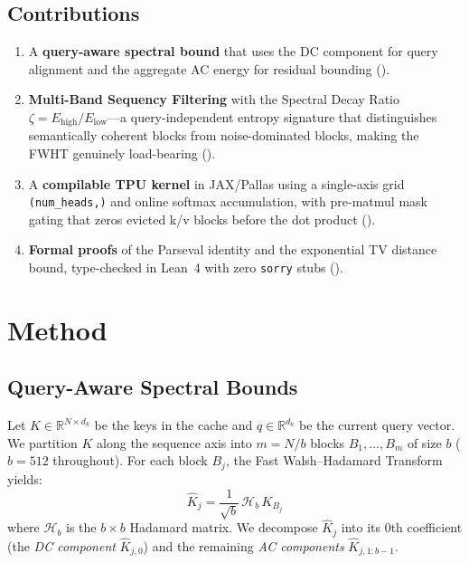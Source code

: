 \documentclass[conference,10pt]{IEEEtran}
\newcommand{\R}{\mathbb{R}}
\begin{document}
\subsection{Contributions}

\begin{enumerate}
    \item A \textbf{query-aware spectral bound} that uses the DC component for
          query alignment and the aggregate AC energy for residual bounding
          ().
    \item \textbf{Multi-Band Sequency Filtering} with the Spectral Decay
          Ratio $\zeta = E_{\text{high}} / E_{\text{low}}$---a query-independent
          entropy signature that distinguishes semantically coherent blocks from
          noise-dominated blocks, making the FWHT genuinely load-bearing
          ().
    \item A \textbf{compilable TPU kernel} in JAX/Pallas using a single-axis
          grid \texttt{(num\_heads,)} and online softmax accumulation, with
          pre-matmul mask gating that zeros evicted k/v blocks before the dot
          product ().
    \item \textbf{Formal proofs} of the Parseval identity and the exponential
          TV distance bound, type-checked in Lean~4 with zero
          \texttt{sorry} stubs ().
\end{enumerate}

\section{Method}\label{sec:method}

\subsection{Query-Aware Spectral Bounds}\label{sec:qabound}

Let $K \in \R^{N \times d_k}$ be the keys in the cache and $q \in \R^{d_k}$ be
the current query vector. We partition $K$ along the sequence axis into
$m = N/b$ blocks $B_1, \dots, B_m$ of size $b$ ($b = 512$ throughout). For each
block $B_j$, the Fast Walsh--Hadamard Transform yields:
\begin{equation}\label{eq:fwht}
    \hat{K}_j = \frac{1}{\sqrt{b}}\, \mathcal{H}_b\, K_{B_j}
\end{equation}
where $\mathcal{H}_b$ is the $b \times b$ Hadamard matrix. We decompose
$\hat{K}_j$ into its 0th coefficient (the \emph{DC component}
$\hat{K}_{j,0}$) and the remaining \emph{AC components}
$\hat{K}_{j,1:b-1}$.
\end{document}
